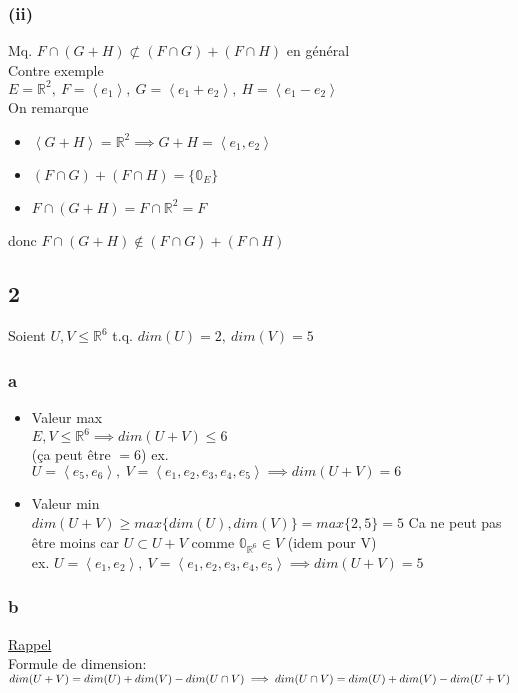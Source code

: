\documentclass[11pt]{exam}
\newcommand{\R}{\mathbb{R}}
\newcommand{\0}{\mathbb{0}}
\begin{document}
\subsubsection*{(ii)}
Mq. $F\cap(G+H) \not\subset (F\cap G) + (F\cap H)$ en général\\
Contre exemple\\
$E = \R^2,\ F = \left<e_1\right>,\ G = \left<e_1+e_2\right>,\ H = \left<e_1-e_2\right>$\\
On remarque 
\begin{itemize}
    \item $\left<G+H\right> = \R^2 \implies G+H = \left<e_1,e_2\right>$
    \item $(F\cap G) + (F\cap H) = \{\mathbb{0}_E\}$
    \item $F\cap(G+H) = F\cap\R^2 = F$
\end{itemize}
donc $F\cap(G+H) \not\in (F\cap G) + (F\cap H)$
\subsection*{2}
Soient $U,V \leq \R^6$ t.q. $dim(U)=2,\ dim(V)=5$
\subsubsection*{a}
\begin{itemize}
    \item Valeur max\\
    $E,V \leq \R^6 \implies dim(U+V) \leq 6$\\
    (ça peut être $=6$) ex. $U = \left<e_5,e_6\right>,\ V = \left<e_1,e_2,e_3,e_4,e_5\right> \implies dim(U+V) = 6$
    \item Valeur min\\
    $dim(U+V) \geq max\{dim(U), dim(V)\} = max\{2,5\} = 5$ Ca ne peut pas être moins car $U \subset U+V$ comme $\mathbb{0}_{\R^6} \in V$ (idem pour V)\\
    ex. $U = \left<e_1,e_2\right>,\ V = \left<e_1,e_2,e_3,e_4,e_5\right> \implies dim(U+V) = 5$
\end{itemize}
\subsubsection*{b}
\underline{Rappel}\\
Formule de dimension: $dim(U+V) = dim(U) + dim(V) - dim(U\cap V)\\\implies dim(U\cap V) = dim(U) + dim(V) - dim(U+V)$\\\hbox{}
\end{document}
